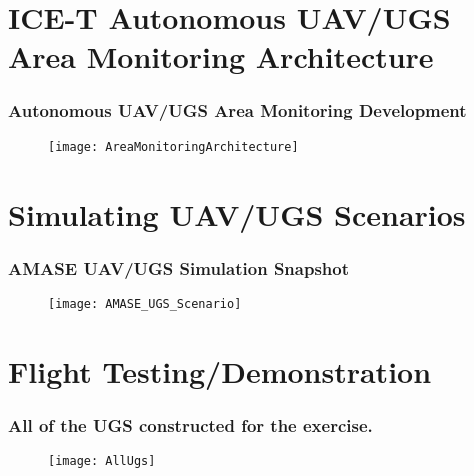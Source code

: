 \documentclass{beamer}
\begin{document}
\section{ICE-T Autonomous UAV/UGS Area Monitoring Architecture}
\begin{frame}\frametitle{Autonomous UAV/UGS Area Monitoring Development} 
\begin{figure}
\centering
      \texttt{[image: AreaMonitoringArchitecture]}
      \label{fig:AreaMonitoringArchitecture}
\end{figure}
\end{frame}
\section{Simulating UAV/UGS Scenarios\label{sec:Simulation}}
\begin{frame}\frametitle{AMASE UAV/UGS Simulation Snapshot} 
\begin{figure}[htb]
\centering
      \texttt{[image: AMASE\_UGS\_Scenario]}
\end{figure}
\end{frame}

\section{Flight Testing/Demonstration\label{sec:FlightTest}}
\begin{frame}\frametitle{All of the UGS constructed for the exercise.} 
\begin{figure}[htb]
\centering
      \texttt{[image: AllUgs]}
\end{figure}
\end{frame}
\end{document}
